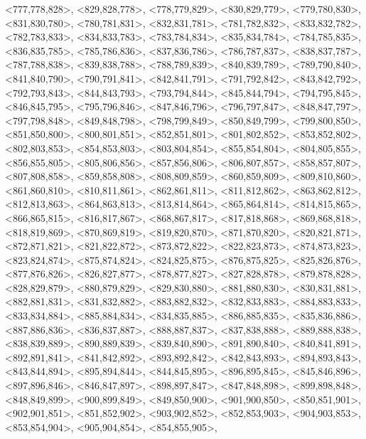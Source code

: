 \documentclass[a4paper,10pt]{article}
\begin{document}
\begin{eulernotebook}
\begin{euleroutput}
  <777,778,828>,
  <829,828,778>,
  <778,779,829>,
  <830,829,779>,
  <779,780,830>,
  <831,830,780>,
  <780,781,831>,
  <832,831,781>,
  <781,782,832>,
  <833,832,782>,
  <782,783,833>,
  <834,833,783>,
  <783,784,834>,
  <835,834,784>,
  <784,785,835>,
  <836,835,785>,
  <785,786,836>,
  <837,836,786>,
  <786,787,837>,
  <838,837,787>,
  <787,788,838>,
  <839,838,788>,
  <788,789,839>,
  <840,839,789>,
  <789,790,840>,
  <841,840,790>,
  <790,791,841>,
  <842,841,791>,
  <791,792,842>,
  <843,842,792>,
  <792,793,843>,
  <844,843,793>,
  <793,794,844>,
  <845,844,794>,
  <794,795,845>,
  <846,845,795>,
  <795,796,846>,
  <847,846,796>,
  <796,797,847>,
  <848,847,797>,
  <797,798,848>,
  <849,848,798>,
  <798,799,849>,
  <850,849,799>,
  <799,800,850>,
  <851,850,800>,
  <800,801,851>,
  <852,851,801>,
  <801,802,852>,
  <853,852,802>,
  <802,803,853>,
  <854,853,803>,
  <803,804,854>,
  <855,854,804>,
  <804,805,855>,
  <856,855,805>,
  <805,806,856>,
  <857,856,806>,
  <806,807,857>,
  <858,857,807>,
  <807,808,858>,
  <859,858,808>,
  <808,809,859>,
  <860,859,809>,
  <809,810,860>,
  <861,860,810>,
  <810,811,861>,
  <862,861,811>,
  <811,812,862>,
  <863,862,812>,
  <812,813,863>,
  <864,863,813>,
  <813,814,864>,
  <865,864,814>,
  <814,815,865>,
  <866,865,815>,
  <816,817,867>,
  <868,867,817>,
  <817,818,868>,
  <869,868,818>,
  <818,819,869>,
  <870,869,819>,
  <819,820,870>,
  <871,870,820>,
  <820,821,871>,
  <872,871,821>,
  <821,822,872>,
  <873,872,822>,
  <822,823,873>,
  <874,873,823>,
  <823,824,874>,
  <875,874,824>,
  <824,825,875>,
  <876,875,825>,
  <825,826,876>,
  <877,876,826>,
  <826,827,877>,
  <878,877,827>,
  <827,828,878>,
  <879,878,828>,
  <828,829,879>,
  <880,879,829>,
  <829,830,880>,
  <881,880,830>,
  <830,831,881>,
  <882,881,831>,
  <831,832,882>,
  <883,882,832>,
  <832,833,883>,
  <884,883,833>,
  <833,834,884>,
  <885,884,834>,
  <834,835,885>,
  <886,885,835>,
  <835,836,886>,
  <887,886,836>,
  <836,837,887>,
  <888,887,837>,
  <837,838,888>,
  <889,888,838>,
  <838,839,889>,
  <890,889,839>,
  <839,840,890>,
  <891,890,840>,
  <840,841,891>,
  <892,891,841>,
  <841,842,892>,
  <893,892,842>,
  <842,843,893>,
  <894,893,843>,
  <843,844,894>,
  <895,894,844>,
  <844,845,895>,
  <896,895,845>,
  <845,846,896>,
  <897,896,846>,
  <846,847,897>,
  <898,897,847>,
  <847,848,898>,
  <899,898,848>,
  <848,849,899>,
  <900,899,849>,
  <849,850,900>,
  <901,900,850>,
  <850,851,901>,
  <902,901,851>,
  <851,852,902>,
  <903,902,852>,
  <852,853,903>,
  <904,903,853>,
  <853,854,904>,
  <905,904,854>,
  <854,855,905>,

\end{euleroutput}
\end{eulernotebook}
\end{document}
